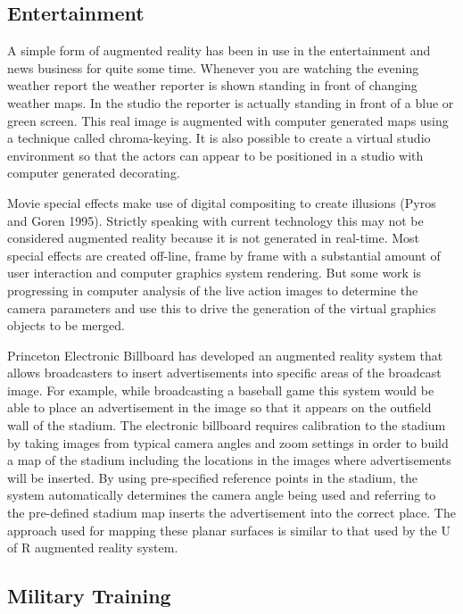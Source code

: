 \subsection{Entertainment}

A simple form of augmented reality has been in use in the entertainment and news business for quite some time. Whenever you are watching the evening weather report the weather reporter is shown standing in front of changing weather maps. In the studio the reporter is actually standing in front of a blue or green screen. This real image is augmented with computer generated maps using a technique called chroma-keying. It is also possible to create a virtual studio environment so that the actors can appear to be positioned in a studio with computer generated decorating.

Movie special effects make use of digital compositing to create illusions (Pyros and Goren 1995). Strictly speaking with current technology this may not be considered augmented reality because it is not generated in real-time. Most special effects are created off-line, frame by frame with a substantial amount of user interaction and computer graphics system rendering. But some work is progressing in computer analysis of the live action images to determine the camera parameters and use this to drive the generation of the virtual graphics objects to be merged.

Princeton Electronic Billboard has developed an augmented reality system that allows broadcasters to insert advertisements into specific areas of the broadcast image. For example, while broadcasting a baseball game this system would be able to place an advertisement in the image so that it appears on the outfield wall of the stadium. The electronic billboard requires calibration to the stadium by taking images from typical camera angles and zoom settings in order to build a map of the stadium including the locations in the images where advertisements will be inserted. By using pre-specified reference points in the stadium, the system automatically determines the camera angle being used and referring to the pre-defined stadium map inserts the advertisement into the correct place. The approach used for mapping these planar surfaces is similar to that used by the U of R augmented reality system.

\subsection{Military Training}

